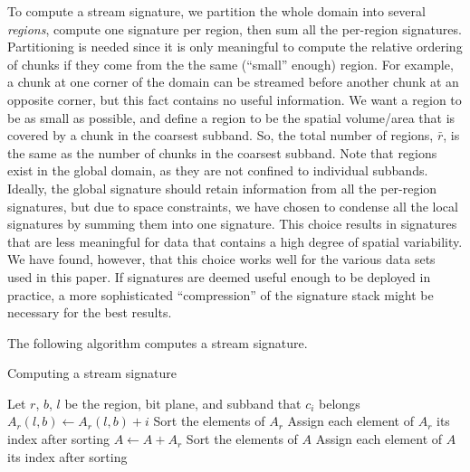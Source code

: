 To compute a stream signature, we partition the whole domain into several \emph{regions}, compute
one signature per region, then sum all the per-region signatures. Partitioning is needed since it is
only meaningful to compute the relative ordering of chunks if they come from the the same (``small''
enough) region. For example, a chunk at one corner of the domain can be streamed before another
chunk at an opposite corner, but this fact contains no useful information. We want a region to be as
small as possible, and define a region to be the spatial volume/area that is covered by a chunk in
the coarsest subband. So, the total number of regions, $\bar{r}$, is the same as the number of
chunks in the coarsest subband. Note that regions exist in the global domain, as they are not
confined to individual subbands. Ideally, the global signature should retain information from all
the per-region signatures, but due to space constraints, we have chosen to condense all the local
signatures by summing them into one signature. This choice results in signatures that are less
meaningful for data that contains a high degree of spatial variability. We have found, however, that
this choice works well for the various data sets used in this paper. If signatures are deemed useful
enough to be deployed in practice, a more sophisticated ``compression'' of the signature stack might
be necessary for the best results.

The following algorithm computes a stream signature.

\begin{algorithm}[h]
  \caption{Computing a stream signature}
  \begin{algorithmic}[1]
			\State Let $r$, $b$, $l$ be the region, bit plane, and subband that $c_i$ belongs
			\State $A_r(l,b) \gets A_r(l,b)+i$
		\EndFor
			\State Sort the elements of $A_r$
			\State Assign each element of $A_r$ its index after sorting
			\State $A \gets A+A_r$
		\EndFor
		\State Sort the elements of $A$
		\State Assign each element of $A$ its index after sorting
	\end{algorithmic}
	\label{alg:greedy}
\end{algorithm}

